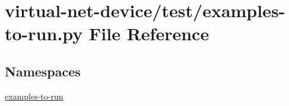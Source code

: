 \hypertarget{virtual-net-device_2test_2examples-to-run_8py}{}\section{virtual-\/net-\/device/test/examples-\/to-\/run.py File Reference}
\label{virtual-net-device_2test_2examples-to-run_8py}
\subsection*{Namespaces}
\begin{DoxyCompactItemize}
\item 
 \hyperlink{namespaceexamples-to-run}{examples-\/to-\/run}
\end{DoxyCompactItemize}
